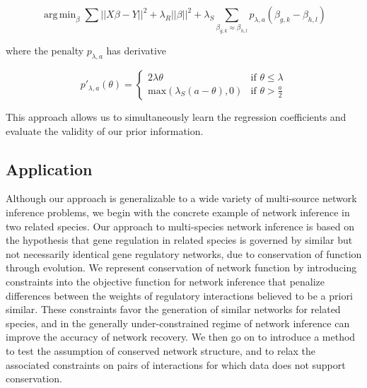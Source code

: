 \documentclass[11pt]{article}
\DeclareMathOperator*{\argmin}{arg\,min}
\begin{document}
\begin{equation}
\argmin_{\beta} \displaystyle\sum \vert \vert X\beta - Y \vert \vert ^2 + \lambda_R \vert \vert \beta \vert \vert ^2 + \displaystyle \lambda_S  \displaystyle \sum_{\beta_{g,k} \approx \beta_{h,l}} p_{\lambda, a} (\beta_{g,k} - \beta_{h,l})
\end{equation}

where the penalty $p_{\lambda, a}$ has derivative 

\begin{equation}
p'_{\lambda,a}(\theta) = \left\{
    \begin{array}{lr}
    2\lambda\theta & \text{if } \theta \leq \lambda\\
    \text{max}(\lambda_S(a-\theta),0) & \text{if } \theta > \frac{a}{2}
    \end{array}
    \right.
\end{equation}

 This approach allows us to simultaneously learn the regression coefficients and evaluate the validity of our prior information. 

\subsection{Application}
Although our approach is generalizable to a wide variety of multi-source network inference problems, we begin with the concrete example of network inference in two related species. Our approach to multi-species network inference is based on the hypothesis that gene regulation in related species is governed by similar but not necessarily identical gene regulatory networks, due to conservation of function through evolution. We represent conservation of network function by introducing constraints into the objective function for network inference that penalize differences between the weights of regulatory interactions believed to be a priori similar. These constraints favor the generation of similar networks for related species, and in the generally under-constrained regime of network inference can improve the accuracy of network recovery. We then go on to introduce a method to test the assumption of conserved network structure, and to relax the associated constraints on pairs of interactions for which data does not support conservation.
\end{document}
